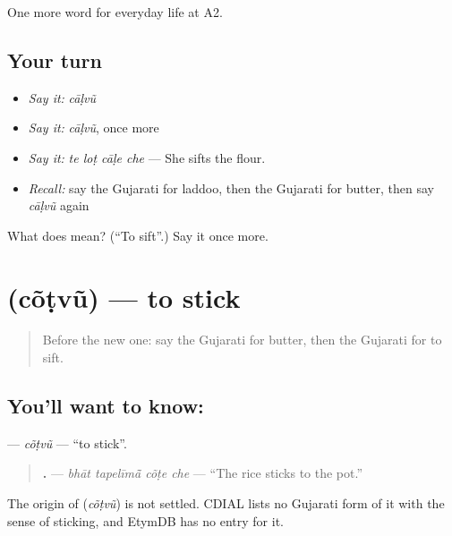 \begin{grammarlens}[title={What you've built}]
One more word for everyday life at A2.
\end{grammarlens}

\subsection*{Your turn}
\begin{itemize}
\raggedright
  \item \emph{Say it:} \emph{cāḷvũ}
  \item \emph{Say it:} \emph{cāḷvũ}, once more
  \item \emph{Say it:} \emph{te loṭ cāḷe che} — She sifts the flour.
  \item \emph{Recall:} say the Gujarati for laddoo, then the Gujarati for butter, then say \emph{cāḷvũ} again
\end{itemize}

\begin{tcolorbox}[breakable,colback=teal!4,colframe=teal!35!black,title={Before you move on}]
What does  mean? (\textquotedblleft{}To sift\textquotedblright{}.) Say it once more.
\end{tcolorbox}
\section[\texorpdfstring{\gu{ચોંટવું} (cõṭvũ)}{ચોંટવું (cõṭvũ)}]{ (cõṭvũ) — to stick}

\label{lesson:GU-C170-cotvu}



\begin{quote}
Before the new one: say the Gujarati for butter, then the Gujarati for to sift.
\end{quote}

\subsection*{You'll want to know: }
\textbf{} — \emph{cõṭvũ} — \textquotedblleft{}to stick\textquotedblright{}.

\begin{quote}
\textbf{   .} — \emph{bhāt tapelīmā̃ cõṭe che} — \textquotedblleft{}The rice sticks to the pot.\textquotedblright{}
\end{quote}

\begin{cousinweb}
The origin of \textbf{} (\emph{cõṭvũ}) is not settled. CDIAL lists no Gujarati form of it with the sense of sticking, and EtymDB has no entry for it.
\end{cousinweb}

